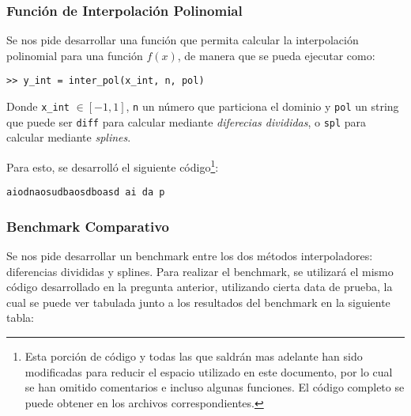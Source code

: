 \documentclass[12pt,letterpaper]{article}
\begin{document}
\subsubsection{Función de Interpolación Polinomial}
Se nos pide desarrollar una función que permita calcular la interpolación polinomial para una función $f(x)$, de manera que se pueda ejecutar como:
\begin{center}
\verb+>> y_int = inter_pol(x_int, n, pol)+
\end{center}

Donde \verb+x_int+ $\in [-1,1]$, \verb+n+ un número que particiona el dominio y \verb+pol+ un string que puede ser \verb+diff+ para calcular mediante \textit{diferecias divididas}, o \verb+spl+ para calcular mediante \textit{splines}.

Para esto, se desarrolló el siguiente código\footnote{Esta porción de código y todas las que saldrán mas adelante han sido modificadas para reducir el espacio utilizado en este documento, por lo cual se han omitido comentarios e incluso algunas funciones. El código completo se puede obtener en los archivos correspondientes.}:
\begin{verbatim}
aiodnaosudbaosdboasd ai da p
\end{verbatim}

\subsubsection{Benchmark Comparativo}
Se nos pide desarrollar un benchmark entre los dos métodos interpoladores: diferencias divididas y splines. Para realizar el benchmark, se utilizará el mismo código desarrollado en la pregunta anterior, utilizando cierta data de prueba, la cual se puede ver tabulada junto a los resultados del benchmark en la siguiente tabla:
\end{document}
